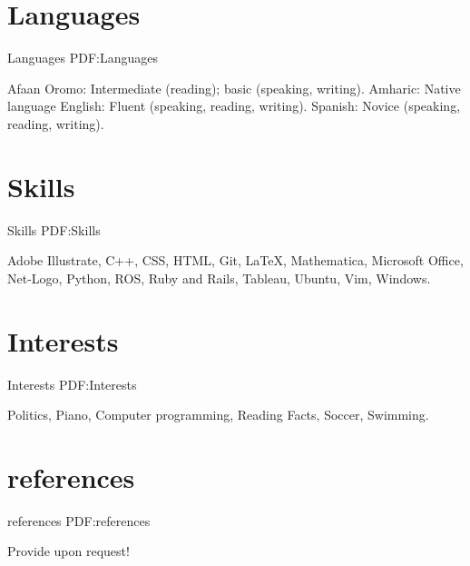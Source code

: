 \documentclass[letterpaper,10pt,oneside]{article}
\begin{document}
\begin{body}




\section
{Languages}
{Languages}
{PDF:Languages}

\BulletItem
Afaan Oromo: Intermediate (reading); basic (speaking, writing).
\BulletItem
Amharic: Native language
\GapNoBreak
\BulletItem
English: Fluent (speaking, reading, writing).
\GapNoBreak
\BulletItem
Spanish: Novice (speaking, reading, writing).



\section
{Skills}
{Skills}
{PDF:Skills}

 Adobe Illustrate, C++, CSS, HTML, Git, {\LaTeX}, Mathematica, Microsoft Office, Net-Logo, Python, ROS, Ruby and Rails, Tableau, Ubuntu, Vim, Windows.



\section
{Interests}
{Interests}
{PDF:Interests}

Politics,
Piano,
Computer programming,
Reading Facts,
Soccer,
Swimming.





\section
{references}
{references}
{PDF:references}

Provide upon request!


\end{body}

\label{LastPage}~
\end{document}
